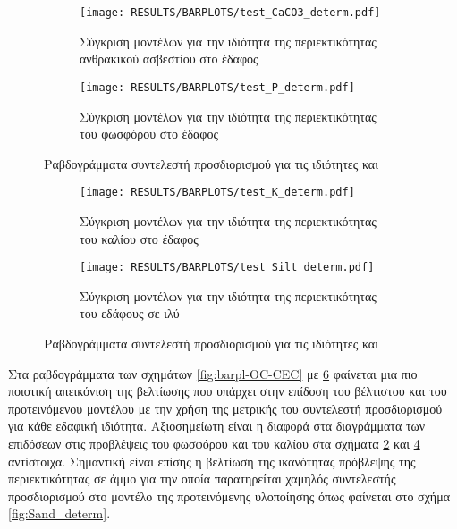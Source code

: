 \begin{figure}[H]
    \begin{subfigure}{0.5\textwidth}
        \texttt{[image: RESULTS/BARPLOTS/test\_CaCO3\_determ.pdf]}
        \caption{Σύγκριση μοντέλων για την ιδιότητα της περιεκτικότητας ανθρακικού ασβεστίου στο έδαφος}
        \label{fig:CaCO3_determ}
    \end{subfigure}
    \begin{subfigure}{0.5\textwidth}
        \texttt{[image: RESULTS/BARPLOTS/test\_P\_determ.pdf]}
        \caption{Σύγκριση μοντέλων για την ιδιότητα της περιεκτικότητας του φωσφόρου στο έδαφος}
        \label{fig:P_determ}
    \end{subfigure}
    \caption{Ραβδογράμματα συντελεστή προσδιορισμού για τις ιδιότητες  και }
    \label{fig:barpl-CacCO3-Pc}
\end{figure}
\begin{figure}[H]
    \begin{subfigure}{0.5\textwidth}
        \texttt{[image: RESULTS/BARPLOTS/test\_K\_determ.pdf]}
        \caption{Σύγκριση μοντέλων για την ιδιότητα της περιεκτικότητας του καλίου στο έδαφος}
        \label{fig:K_determ}
    \end{subfigure}
    \begin{subfigure}{0.5\textwidth}
        \texttt{[image: RESULTS/BARPLOTS/test\_Silt\_determ.pdf]}
        \caption{Σύγκριση μοντέλων για την ιδιότητα της περιεκτικότητας του εδάφους σε ιλύ}
        \label{fig:Silt_determ}
    \end{subfigure}
    \caption{Ραβδογράμματα συντελεστή προσδιορισμού για τις ιδιότητες  και }
    \label{fig:barpl-K-Silt}
\end{figure}

Στα ραβδογράμματα των σχημάτων \ref{fig:barpl-OC-CEC} με \ref{fig:barpl-K-Silt} φαίνεται μια πιο ποιοτική απεικόνιση της βελτίωσης που υπάρχει στην επίδοση του βέλτιστου και του προτεινόμενου μοντέλου με την χρήση της μετρικής του συντελεστή προσδιορισμού για κάθε εδαφική ιδιότητα. Αξιοσημείωτη είναι η διαφορά στα διαγράμματα των επιδόσεων στις προβλέψεις του φωσφόρου και του καλίου στα σχήματα \ref{fig:P_determ} και \ref{fig:K_determ} αντίστοιχα. Σημαντική είναι επίσης η βελτίωση της ικανότητας πρόβλεψης της περιεκτικότητας σε άμμο για την οποία παρατηρείται χαμηλός συντελεστής προσδιορισμού στο μοντέλο της προτεινόμενης υλοποίησης όπως φαίνεται στο σχήμα \ref{fig:Sand_determ}.

